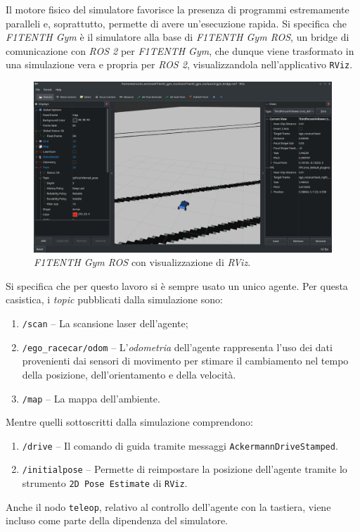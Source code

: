 Il motore fisico del simulatore favorisce la presenza di programmi estremamente paralleli e, 
soprattutto, permette di avere un'esecuzione rapida.
Si specifica che \textit{F1TENTH Gym} è il simulatore alla base di \textit{F1TENTH Gym ROS}, 
un bridge di comunicazione con \textit{ROS 2} per \textit{F1TENTH Gym}, che dunque 
viene trasformato in una simulazione vera e propria per \textit{ROS 2}, visualizzandola nell'applicativo \verb|RViz|.

\begin{figure}[H]
    \centering
    \includegraphics[width=\textwidth]{images/rviz.png}
    \caption{\textit{F1TENTH Gym ROS} con visualizzazione di \textit{RViz}.}
    \label{fig:fig3} %
\end{figure}

Si specifica che per questo lavoro si è sempre usato un unico agente. Per questa casistica,
i \textit{topic} pubblicati dalla simulazione sono:
\begin{enumerate}
    \item \verb|/scan| -- La scansione laser dell'agente;
    \item \verb|/ego_racecar/odom| -- L'\textit{odometria} dell'agente rappresenta l'uso dei dati provenienti dai sensori di movimento per stimare il cambiamento nel tempo della posizione, dell'orientamento e della velocità.
    \item \verb|/map| -- La mappa dell'ambiente.
\end{enumerate}
Mentre quelli sottoscritti dalla simulazione comprendono:
\begin{enumerate}
    \item \verb|/drive| -- Il comando di guida tramite messaggi \verb|AckermannDriveStamped|.
    \item \verb|/initialpose| -- Permette di reimpostare la posizione dell'agente tramite lo strumento \verb|2D Pose Estimate| di \verb|RViz|.
\end{enumerate}
Anche il nodo \verb|teleop|, relativo al controllo dell'agente con la tastiera, viene incluso come parte della dipendenza del simulatore.

